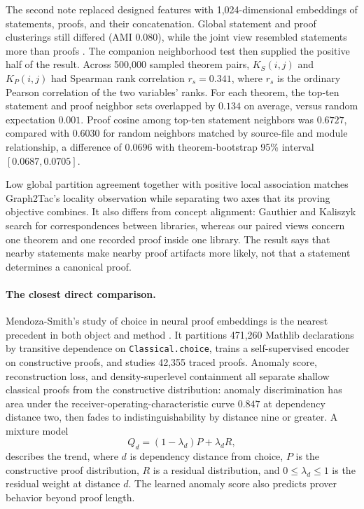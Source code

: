\documentclass[11pt]{article}
\begin{document}
The second note replaced designed features with 1,024-dimensional embeddings of statements,
proofs, and their concatenation.  Global statement and proof clusterings still differed
(AMI $0.080$), while the joint view resembled statements more than proofs \cite{statements}.
The companion neighborhood test then supplied the positive half of the result.  Across 500,000
sampled theorem pairs, $K_S(i,j)$ and $K_P(i,j)$ had Spearman rank correlation $r_s=0.341$, where
$r_s$ is the ordinary Pearson correlation of the two variables' ranks.  For each theorem, the
top-ten statement and proof neighbor sets overlapped by $0.134$ on average, versus random
expectation $0.001$.  Proof cosine among top-ten statement neighbors was $0.6727$, compared with
$0.6030$ for random neighbors matched by source-file and module relationship, a difference of
$0.0696$ with theorem-bootstrap 95\% interval $[0.0687,0.0705]$.

Low global partition agreement together with positive local association matches Graph2Tac's
locality observation while separating two axes that its proving objective combines.
It also differs from concept alignment: Gauthier and Kaliszyk search for correspondences between
libraries, whereas our paired views concern one theorem and one recorded proof inside one library.
The result says that nearby statements make nearby proof artifacts more likely, not that a
statement determines a canonical proof.

\paragraph{The closest direct comparison.}
Mendoza-Smith's study of choice in neural proof embeddings is the nearest precedent in both object
and method \cite{choice}.  It partitions 471,260 Mathlib declarations by transitive dependence on
\texttt{Classical.choice}, trains a self-supervised encoder on constructive proofs, and studies
42,355 traced proofs.  Anomaly score, reconstruction loss, and density-superlevel containment all
separate shallow classical proofs from the constructive distribution: anomaly discrimination has
area under the receiver-operating-characteristic curve $0.847$ at dependency distance two, then
fades to indistinguishability by distance nine or greater.  A mixture model
\[
 Q_d=(1-\lambda_d)P+\lambda_d R,
\]
describes the trend, where $d$ is dependency distance from choice, $P$ is the constructive proof
distribution, $R$ is a residual distribution, and $0\leq\lambda_d\leq1$ is the residual weight at
distance $d$.  The learned anomaly score also predicts prover behavior beyond proof length.
\end{document}
